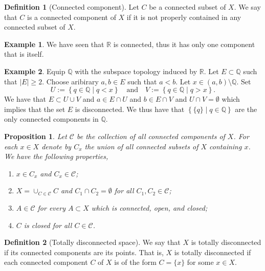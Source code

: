 \documentclass[11pt,a4paper]{article}
\theoremstyle{definition}
\newtheorem{definition}{Definition}[section]
\newtheorem{example}{Example}[section]
\theoremstyle{plain}
\newtheorem{proposition}[theorem]{Proposition}
\newcommand{\Q}{\mathbb{Q}}
\newcommand{\R}{\mathbb{R}}
\newcommand{\tand}{\quad \text{and} \quad}
\newcommand{\set}[2]{ \left\{ #1 \mid #2 \right\} }
\begin{document}
  \begin{definition}[Connected component]
    Let $C$ be a connected subset of $X$.
    We say that $C$ is a connected component of $X$ 
    if it is not properly contained in any connected subset of $X$.
  \end{definition}

  \begin{example}
    We have seen that $\R$ is connected, thus it has only one component
    that is itself.
  \end{example}

  \begin{example}
    Equip $\Q$ with the subspace topology induced by $\R$.
    Let $E \subset \Q$ such that $|E| \geq 2$.
    Choose aribirary $a,b \in E$ such that $a < b$.
    Let $x \in (a,b) \setminus \Q$. Set
    \[
      U := \set{q \in \Q}{q < x} \tand
      V := \set{q \in \Q}{q > x}.
    \]
    We have that $E \subset U \cup V$ and $a \in E \cap U$ and
    $b \in E \cap V$ and $U \cap V = \emptyset$ which implies that
    the set $E$ is disconnected.
    We thus have that $\set{\{q\}}{q \in \Q}$ are the only connected
    components in $\Q$.
  \end{example}

  \begin{proposition}
    Let $\mathcal C$ be the collection of all connected components of $X$.
    For each $x \in X$ denote by $C_x$ the union of all connected subsets 
    of $X$ containing $x$.
    We have the following properties,
    \begin{enumerate}
      \item[(1)] $x \in C_x$ and $C_x \in \mathcal C$;
      \item[(2)] $X = \cup_{C \in \mathcal C} C$ and $C_1 \cap C_2 = \emptyset$
        for all $C_1,C_2 \in \mathcal C$;
      \item[(3)] $A \in \mathcal C$ for every $A \subset X$ which is connected,
        open, and closed;
      \item[(4)] $C$ is closed for all $C \in \mathcal C$.
    \end{enumerate}
  \end{proposition}

  \begin{definition}[Totally disconnected space]
    We say that $X$ is totally disconnected if its connected components
    are its points.
    That is, $X$ is totally disconnected if each connected component $C$
    of $X$ is of the form $C = \{x\}$ for some $x \in X$.
  \end{definition}
\end{document}
